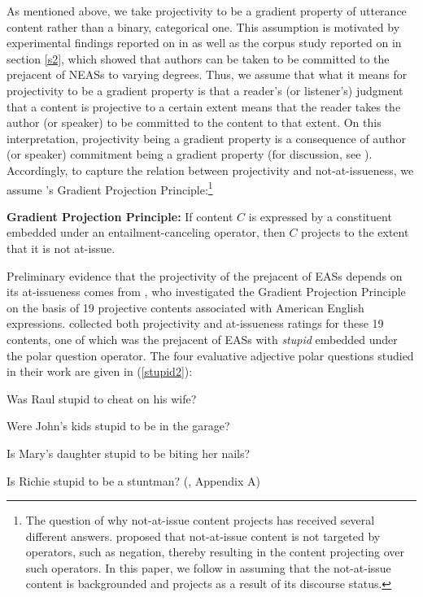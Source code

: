 \documentclass[11pt,fleqn]{article}
\newcommand{\6}{\mbox{$[\hspace*{-.6mm}[$}}
\newcommand{\9}{\mbox{$]\hspace*{-.6mm}]$}}
\newcommand{\citepos}[1]{\citeauthor{#1}'s \citeyear{#1}}
\begin{document}
As mentioned above, we take projectivity to be a gradient property of utterance content rather than a binary, categorical one. This assumption is motivated by experimental findings reported on in \citealt{tbd-variability} as well as the corpus study reported on in section \ref{s2}, which showed that authors can be taken to be committed to the prejacent of NEASs to varying degrees. Thus, we assume that what it means for projectivity to be a gradient property is that a reader's (or listener's) judgment that a content is projective to a certain extent means that the reader takes the author (or speaker) to be committed to the content to that extent. On this interpretation, projectivity being a gradient property is a consequence of author (or speaker) commitment being a gradient property (for discussion, see \citealt{tbd-variability}). Accordingly, to capture the relation between projectivity and not-at-issueness, we assume \citepos{tbd-variability} Gradient Projection Principle:\footnote{The question of why not-at-issue content projects has received several different answers. \citet{brst-salt10} proposed that not-at-issue content is not targeted by operators, such as negation, thereby resulting in the content projecting over such operators. In this paper, we follow \citet{abrusan2011} in assuming that the not-at-issue content is backgrounded and projects as a result of its discourse status.}

\begin{exe}
\ex\label{gpp} {\bf Gradient Projection Principle:} If content $C$ is expressed by a constituent embedded under an entailment-canceling operator, then $C$ projects to the 
extent that it is not at-issue.

\end{exe}

Preliminary evidence that the projectivity of the prejacent of EASs depends on its at-issueness comes from \citealt{tbd-variability}, who investigated the Gradient Projection Principle on the basis of 19 projective contents associated with American English expressions. \citet{tbd-variability} collected both projectivity and at-issueness ratings for these 19 contents, one of which was the prejacent of EASs with {\em stupid} embedded under the polar question operator. The four evaluative adjective polar questions studied in their work are given in (\ref{stupid2}):

\begin{exe}
\ex\label{stupid2}

\begin{xlist}

\ex Was Raul stupid to cheat on his wife?

\ex Were John's kids stupid to be in the garage?

\ex Is Mary's daughter stupid to be biting her nails?

\ex Is Richie stupid to be a stuntman? \hfill (\citealt{tbd-variability}, Appendix A)

\end{xlist}

\end{exe}
\end{document}
